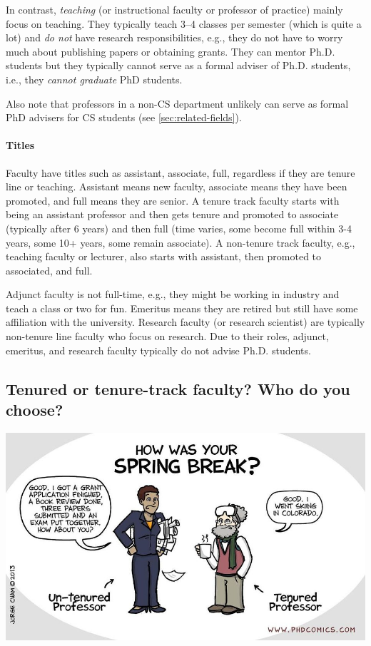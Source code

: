\documentclass[oneside,11pt]{memoir}
\begin{document}
In contrast, \emph{teaching} (or instructional faculty or professor of practice) mainly focus on teaching. They typically teach 3--4 classes per semester (which is quite a lot) and \emph{do not} have research responsibilities, e.g., they do not have to worry much about publishing papers or obtaining grants. They can mentor Ph.D. students but they typically cannot serve as a formal adviser of Ph.D. students, i.e., they \emph{cannot graduate} PhD students.

Also note that professors in a non-CS department unlikely can serve as formal PhD advisers for CS students (see \autoref{sec:related-fields}).

\paragraph{Titles} Faculty have titles such as assistant, associate, full, regardless if they are tenure line or teaching.  Assistant means new faculty, associate means they have been promoted, and full means they are senior. A tenure track faculty starts with being an assistant professor and then gets tenure and promoted to associate (typically after 6 years) and then full (time varies, some become full within 3-4 years, some 10+ years, some remain associate). A non-tenure track faculty, e.g., teaching faculty or lecturer, also starts with assistant, then promoted to associated, and full.

Adjunct faculty is not full-time, e.g., they might be working in industry and teach a class or two for fun.  Emeritus means they are retired but still have some affiliation with the university.  Research faculty (or research scientist) are typically non-tenure line faculty who focus on research.  Due to their roles, adjunct, emeritus, and research faculty typically do not advise Ph.D. students.

\subsection{Tenured or tenure-track faculty? Who do you choose?}\label{sec:tenure-vs-tenure-track}

\begin{center}
  \includegraphics[scale=0.4]{files/c8.png}
\end{center}
\end{document}
